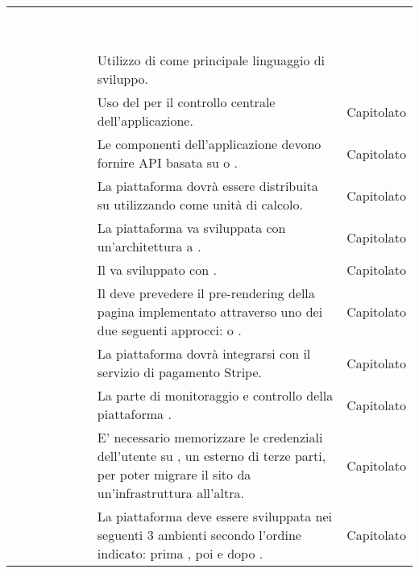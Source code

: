 \renewcommand{\arraystretch}{1.5}
\begin{longtable}{|c C{9.5cm} C{2.5cm}|} 
	
	\textcolor{white}{\textbf{Codice Requisito}}&
	\textcolor{white}{\textbf{Descrizione}}&
	\textcolor{white}{\textbf{Fonte}}\\

	 & Utilizzo di  come principale linguaggio di sviluppo. &  \\
	
	 & Uso del   per il controllo centrale dell'applicazione. & Capitolato \\
	
	 & Le componenti dell'applicazione devono fornire API basata su  o . & Capitolato \\
	
	 & La piattaforma dovrà essere distribuita su  utilizzando  come unità di calcolo. & Capitolato \\
	
	 & La piattaforma va sviluppata con un'architettura a . & Capitolato \\
	
	 & Il  va sviluppato con . & Capitolato \\
	
	 & Il  deve prevedere il pre-rendering della pagina  implementato attraverso uno dei due seguenti approcci:  o . & Capitolato \\
	
	 & La piattaforma dovrà integrarsi con il servizio di pagamento Stripe. & Capitolato \\
	
	 & La parte di monitoraggio e controllo della piattaforma . & Capitolato \\
	
	 & E' necessario memorizzare le credenziali dell'utente su , un  esterno di terze parti, per poter migrare il sito da un'infrastruttura all'altra. & Capitolato \\
	
	 & La piattaforma deve essere sviluppata nei seguenti 3 ambienti secondo l'ordine indicato: prima , poi  e dopo . & Capitolato \\


\end{longtable}
